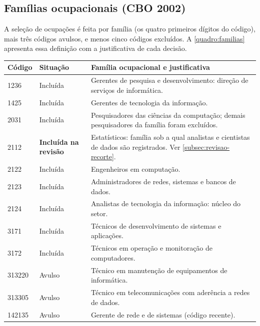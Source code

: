 \begin{apendicesenv}
\section{Famílias ocupacionais (CBO 2002)}

A seleção de ocupações é feita por família (os quatro primeiros dígitos do código), mais três códigos avulsos, e menos cinco códigos excluídos. A \autoref{quadro:familias} apresenta essa definição com a justificativa de cada decisão.

\begin{quadro}[H]
    \centering
    \caption{Famílias e códigos CBO que definem a ocupação de tecnologia}
    \label{quadro:familias}
    \footnotesize
    \renewcommand{\arraystretch}{1.25}
    \begin{tabular}{llp{7.6cm}}
        \toprule
        \rowcolor{black!8}
        \textbf{Código} & \textbf{Situação} & \textbf{Família ocupacional e justificativa} \\
        \midrule
        1236   & Incluída & Gerentes de pesquisa e desenvolvimento: direção de serviços de informática. \\
        1425   & Incluída & Gerentes de tecnologia da informação. \\
        2031   & Incluída & Pesquisadores das ciências da computação; demais pesquisadores da família foram excluídos. \\
        2112   & \textbf{Incluída na revisão} & Estatísticos: família sob a qual analistas e cientistas de dados são registrados. Ver \autoref{subsec:revisao-recorte}. \\
        2122   & Incluída & Engenheiros em computação. \\
        2123   & Incluída & Administradores de redes, sistemas e bancos de dados. \\
        2124   & Incluída & Analistas de tecnologia da informação: núcleo do setor. \\
        3171   & Incluída & Técnicos de desenvolvimento de sistemas e aplicações. \\
        3172   & Incluída & Técnicos em operação e monitoração de computadores. \\
        \midrule
        313220 & Avulso   & Técnico em manutenção de equipamentos de informática. \\
        313305 & Avulso   & Técnico em telecomunicações com aderência a redes de dados. \\
        142135 & Avulso   & Gerente de rede e de sistemas (código recente). \\

\end{tabular}
\end{quadro}
\end{apendicesenv}
